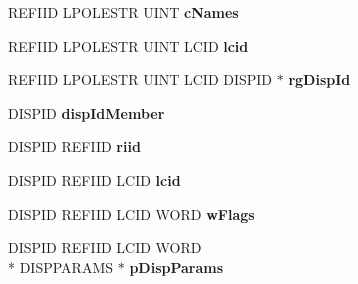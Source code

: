 \begin{DoxyCompactItemize}
\item 
\hypertarget{struct_i_badge_icon_selective_vtbl_ade20167a751dab5106f3fffc0b5e97bc}{R\-E\-F\-I\-I\-D L\-P\-O\-L\-E\-S\-T\-R U\-I\-N\-T {\bfseries c\-Names}}\label{struct_i_badge_icon_selective_vtbl_ade20167a751dab5106f3fffc0b5e97bc}

\item 
\hypertarget{struct_i_badge_icon_selective_vtbl_a9ee554291d318d8c3b2a3716192d74d3}{R\-E\-F\-I\-I\-D L\-P\-O\-L\-E\-S\-T\-R U\-I\-N\-T L\-C\-I\-D {\bfseries lcid}}\label{struct_i_badge_icon_selective_vtbl_a9ee554291d318d8c3b2a3716192d74d3}

\item 
\hypertarget{struct_i_badge_icon_selective_vtbl_a84597f21809668f838543ac5d938c0bf}{R\-E\-F\-I\-I\-D L\-P\-O\-L\-E\-S\-T\-R U\-I\-N\-T L\-C\-I\-D D\-I\-S\-P\-I\-D $\ast$ {\bfseries rg\-Disp\-Id}}\label{struct_i_badge_icon_selective_vtbl_a84597f21809668f838543ac5d938c0bf}

\item 
\hypertarget{struct_i_badge_icon_selective_vtbl_af3d161a5501917061b44bcd758f7ab31}{D\-I\-S\-P\-I\-D {\bfseries disp\-Id\-Member}}\label{struct_i_badge_icon_selective_vtbl_af3d161a5501917061b44bcd758f7ab31}

\item 
\hypertarget{struct_i_badge_icon_selective_vtbl_a3cbcc666584e6d80a4e32270be0a1a9b}{D\-I\-S\-P\-I\-D R\-E\-F\-I\-I\-D {\bfseries riid}}\label{struct_i_badge_icon_selective_vtbl_a3cbcc666584e6d80a4e32270be0a1a9b}

\item 
\hypertarget{struct_i_badge_icon_selective_vtbl_a5e715700ff7f735b05b97158e500918a}{D\-I\-S\-P\-I\-D R\-E\-F\-I\-I\-D L\-C\-I\-D {\bfseries lcid}}\label{struct_i_badge_icon_selective_vtbl_a5e715700ff7f735b05b97158e500918a}

\item 
\hypertarget{struct_i_badge_icon_selective_vtbl_a4a0283e426a518e1fd846e0ecd2e295e}{D\-I\-S\-P\-I\-D R\-E\-F\-I\-I\-D L\-C\-I\-D W\-O\-R\-D {\bfseries w\-Flags}}\label{struct_i_badge_icon_selective_vtbl_a4a0283e426a518e1fd846e0ecd2e295e}

\item 
\hypertarget{struct_i_badge_icon_selective_vtbl_ad4e4ce36acb422c129543ff37a48cddd}{D\-I\-S\-P\-I\-D R\-E\-F\-I\-I\-D L\-C\-I\-D W\-O\-R\-D \\*
D\-I\-S\-P\-P\-A\-R\-A\-M\-S $\ast$ {\bfseries p\-Disp\-Params}}\label{struct_i_badge_icon_selective_vtbl_ad4e4ce36acb422c129543ff37a48cddd}


\end{DoxyCompactItemize}
